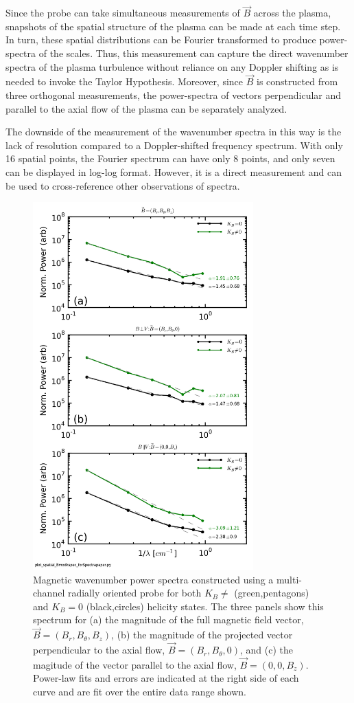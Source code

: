 \documentclass[aip,prl,amsmath,amssymb,reprint,superscriptaddress]{revtex4-1} %
\begin{document}
Since the probe can take simultaneous measurements of $\vec{B}$ across the plasma, snapshots of the spatial structure of the plasma can be made at each time step. In turn, these spatial distributions can be Fourier transformed to produce power-spectra of the scales. Thus, this measurement can capture the direct wavenumber spectra of the plasma turbulence without reliance on any Doppler shifting as is needed to invoke the Taylor Hypothesis. Moreover, since $\vec{B}$ is constructed from three orthogonal measurements, the power-spectra of vectors perpendicular and parallel to the axial flow of the plasma can be separately analyzed. 

The downside of the measurement of the wavenumber spectra in this way is the lack of resolution compared to a Doppler-shifted frequency spectrum. With only 16 spatial points, the Fourier spectrum can have only 8 points, and only seven can be displayed in log-log format. However, it is a direct measurement and can be used to cross-reference other observations of spectra.

\begin{figure}[!htbp]
\centerline{
\includegraphics[width=8.5cm]{Bmod_FFTwavenumberspectra_wFits_40t60us}}
\caption{\label{fig:wavenumber_spectra} Magnetic wavenumber power spectra constructed using a multi-channel radially oriented probe for both $K_{B}\neq$ (green,pentagons) and $K_{B}=0$ (black,circles) helicity states. The three panels show this spectrum for (a) the magnitude of the full magnetic field vector, $\vec{B} = (B_{r},B_{\theta},B_{z})$, (b) the magnitude of the projected vector perpendicular to the axial flow, $\vec{B} = (B_{r},B_{\theta},0)$, and (c) the magitude of the vector parallel to the axial flow, $\vec{B} = (0,0,B_{z})$. Power-law fits and errors are indicated at the right side of each curve and are fit over the entire data range shown.}
\end{figure}
\end{document}
